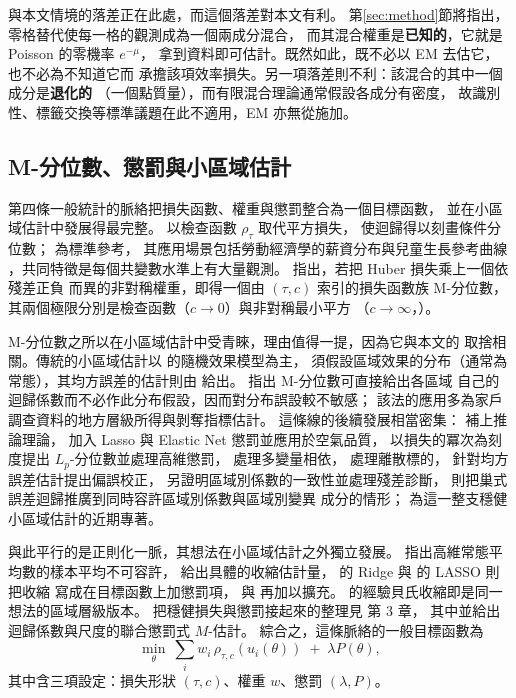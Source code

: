 \documentclass[UTF8, fontset=macnew, a4paper, 12pt]{ctexart}
\begin{document}
與本文情境的落差正在此處，而這個落差對本文有利。
第\ref{sec:method}節將指出，零格替代使每一格的觀測成為一個兩成分混合，
而其混合權重是\textbf{已知的}，它就是 Poisson 的零機率 $e^{-\mu}$，
拿到資料即可估計。既然如此，既不必以 EM 去估它，也不必為不知道它而
承擔該項效率損失。另一項落差則不利：該混合的其中一個成分是\textbf{退化的}
（一個點質量），而有限混合理論通常假設各成分有密度，
故識別性、標籤交換等標準議題在此不適用，EM 亦無從施加。

\subsection{M-分位數、懲罰與小區域估計}

第四條一般統計的脈絡把損失函數、權重與懲罰整合為一個目標函數，
並在小區域估計中發展得最完整。
\citet{koenker1978} 以檢查函數 $\rho_\tau$ 取代平方損失，
使迴歸得以刻畫條件分位數；\citet{koenker2005} 為標準參考，
其應用場景包括勞動經濟學的薪資分布與兒童生長參考曲線
\citep{wei2006}，共同特徵是每個共變數水準上有大量觀測。
\citet{breckling1988} 指出，若把 Huber 損失乘上一個依殘差正負
而異的非對稱權重，即得一個由 $(\tau,c)$ 索引的損失函數族 M-分位數，
其兩個極限分別是檢查函數（$c\to0$）與非對稱最小平方
（$c\to\infty$，\citealp{newey1987}）。

M-分位數之所以在小區域估計中受青睞，理由值得一提，因為它與本文的
取捨相關。傳統的小區域估計以 \citet{fay1979} 的隨機效果模型為主，
須假設區域效果的分布（通常為常態），其均方誤差的估計則由
\citet{prasad1990} 給出。\citet{chambers2006} 指出 M-分位數可直接給出各區域
自己的迴歸係數而不必作此分布假設，因而對分布誤設較不敏感；
該法的應用多為家戶調查資料的地方層級所得與剝奪指標估計。
這條線的後續發展相當密集：\citet{bianchi2018} 補上推論理論，
\citet{ranalli2023} 加入 Lasso 與 Elastic Net 懲罰並應用於空氣品質，
\citet{hu2021} 以損失的冪次為刻度提出 $L_p$-分位數並處理高維懲罰，
\citet{merlo2022} 處理多變量相依，\citet{dawber2022} 處理離散標的，
\citet{bugallo2026} 針對均方誤差估計提出偏誤校正，
\citet{bugallo2025} 另證明區域別係數的一致性並處理殘差診斷，
\citet{lahiri2023} 則把巢式誤差迴歸推廣到同時容許區域別係數與區域別變異
成分的情形；\citet{jiang2026} 為這一整支穩健小區域估計的近期專著。

與此平行的是正則化一脈，其想法在小區域估計之外獨立發展。
\citet{stein1956} 指出高維常態平均數的樣本平均不可容許，
\citet{james1961} 給出具體的收縮估計量，
\citet{hoerl1970} 的 Ridge 與 \citet{tibshirani1996} 的 LASSO 則把收縮
寫成在目標函數上加懲罰項，\citet{zou2005} 與 \citet{zou2006} 再加以擴充。
\citet{fay1979} 的經驗貝氏收縮即是同一想法的區域層級版本。
把穩健損失與懲罰接起來的整理見 \citet{zoubir2018} 第 3 章，
其中並給出迴歸係數與尺度的聯合懲罰式 $M$-估計。
綜合之，這條脈絡的一般目標函數為
\begin{equation}\label{eq:general}
\min_{\theta}\ \sum_{i} w_i\,\rho_{\tau,c}(u_i(\theta))\;+\;\lambda P(\theta),
\end{equation}
其中含三項設定：損失形狀 $(\tau,c)$、權重 $w$、懲罰 $(\lambda,P)$。
\end{document}
